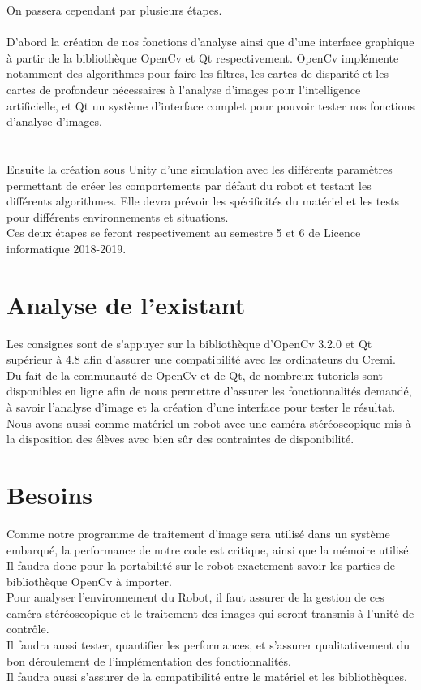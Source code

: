 \documentclass{article}
\begin{document}
	On passera cependant par plusieurs étapes.
	\\\\
	D'abord la création de nos fonctions d'analyse ainsi que d'une interface graphique à partir de la bibliothèque OpenCv et Qt respectivement. OpenCv implémente notamment des algorithmes pour faire les filtres, les cartes de disparité et les cartes de profondeur nécessaires à l'analyse d'images pour l'intelligence artificielle, et Qt un système d'interface complet pour pouvoir tester nos fonctions d'analyse d'images.\\
\\\\
	Ensuite la création sous Unity d'une simulation avec les différents paramètres permettant de créer les comportements par défaut du robot et testant les différents algorithmes. Elle devra prévoir les spécificités du matériel et les tests pour différents environnements et situations.\\
	
	Ces deux étapes se feront respectivement au semestre 5 et 6 de Licence informatique 2018-2019.\\
	
\newpage
\section{Analyse de l’existant}

Les consignes sont de s'appuyer sur la bibliothèque d'OpenCv 3.2.0
et Qt supérieur à 4.8 afin d'assurer une compatibilité avec les ordinateurs du Cremi.\\
Du fait de la communauté de OpenCv et de Qt, de nombreux tutoriels sont disponibles en ligne afin de nous permettre d'assurer les fonctionnalités demandé, à savoir l'analyse d'image et la création d'une interface pour tester le résultat.\\
Nous avons aussi comme matériel un robot avec une caméra stéréoscopique mis à la disposition des élèves avec bien sûr des contraintes de disponibilité.

\section{Besoins}

Comme notre programme de traitement d'image sera utilisé dans un système embarqué, la performance de notre code est critique, ainsi que la mémoire utilisé.\\
Il faudra donc pour la portabilité sur le robot exactement savoir les parties de bibliothèque OpenCv à importer.\\
Pour analyser l'environnement du Robot, il faut assurer de la gestion de ces caméra stéréoscopique et le traitement des images qui seront transmis à l'unité de contrôle.\\
Il faudra aussi tester, quantifier les performances, et s'assurer qualitativement du bon déroulement de l'implémentation des fonctionnalités.\\
Il faudra aussi s'assurer de la compatibilité entre le matériel et les bibliothèques.\\
\end{document}
